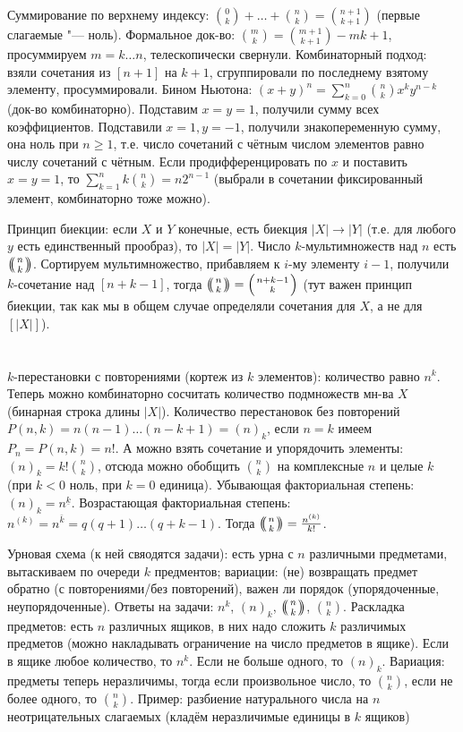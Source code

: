 Суммирование по верхнему индексу: $\binom{0}{k}+\dots+\binom{n}{k}=\binom{n+1}{k+1}$ (первые слагаемые "--- ноль).
Формальное док-во: $\binom{m}{k}=\binom{m+1}{k+1}-{m}{k+1}$, просуммируем $m=k\dots n$, телескопически свернули.
Комбинаторный подход: взяли сочетания из $[n+1]$ на $k+1$, сгруппировали по последнему взятому элементу, просуммировали.
Бином Ньютона: $(x+y)^n=\sum_{k=0}^n \binom{n}{k}x^ky^{n-k}$ (док-во комбинаторно).
Подставим $x=y=1$, получили сумму всех коэффициентов.
Подставили $x=1, y=-1$, получили знакопеременную сумму, она ноль при $n\ge 1$,
т.е. число сочетаний с чётным числом элементов равно числу сочетаний с чётным.
Если продифференцировать по $x$ и поставить $x=y=1$, то $\sum_{k=1}^n k\binom{n}{k} = n2^{n-1}$ (выбрали в сочетании фиксированный элемент, комбинаторно тоже можно).

Принцип биекции: если $X$ и $Y$ конечные, есть биекция $|X|\to|Y|$ (т.е. для любого $y$ есть единственный прообраз), то $|X|=|Y|$.
Число $k$-мультимножеств над $n$ есть $\repbinom{n}{k}$.
Сортируем мультимножество, прибавляем к $i$-му элементу $i-1$, получили $k$-сочетание над $[n+k-1]$,
тогда $\repbinom{n}{k}=\binom{n+k-1}{k}$ (тут важен принцип биекции, так как мы в общем случае определяли сочетания для $X$, а не для $[|X|]$).

\section{} %
$k$-перестановки с повторениями (кортеж из $k$ элементов): количество равно $n^k$.
Теперь можно комбинаторно сосчитать количество подмножеств мн-ва $X$ (бинарная строка длины $|X|$).
Количество перестановок без повторений $P(n, k) = n(n-1)\dots(n-k+1) = (n)_k$, если $n=k$ имеем $P_n=P(n,k)=n!$.
А можно взять сочетание и упорядочить элементы: $(n)_k=k!\binom{n}{k}$, отсюда можно обобщить $\binom{n}{k}$ на
комплексные $n$ и целые $k$ (при $k<0$ ноль, при $k=0$ единица).
Убывающая факториальная степень: $(n)_k=n^{\underline k}$.
Возрастающая факториальная степень: $n^{(k)}=n^{\bar k}=q(q+1)\dots(q+k-1)$.
Тогда $\repbinom{n}{k}=\frac{n^{(k)}}{k!}$.

Урновая схема (к ней свяодятся задачи): есть урна с $n$ различными предметами,
вытаскиваем по очереди $k$ предментов; вариации: (не) возвращать предмет обратно (с повторениями/без повторений),
важен ли порядок (упорядоченные, неупорядоченные).
Ответы на задачи: $n^k$, $(n)_k$, $\repbinom{n}{k}$, $\binom{n}{k}$.
Раскладка предметов: есть $n$ различных ящиков, в них надо сложить $k$ различимых предметов (можно накладывать ограничение
на число предметов в ящике).
Если в ящике любое количество, то $n^k$.
Если не больше одного, то $(n)_k$.
Вариация: предметы теперь неразличимы, тогда если произвольное число, то $\binom{n}{k}$, если не более одного, то $\binom{n}{k}$.
Пример: разбиение натурального числа на $n$ неотрицательных слагаемых (кладём неразличимые единицы в $k$ ящиков)

